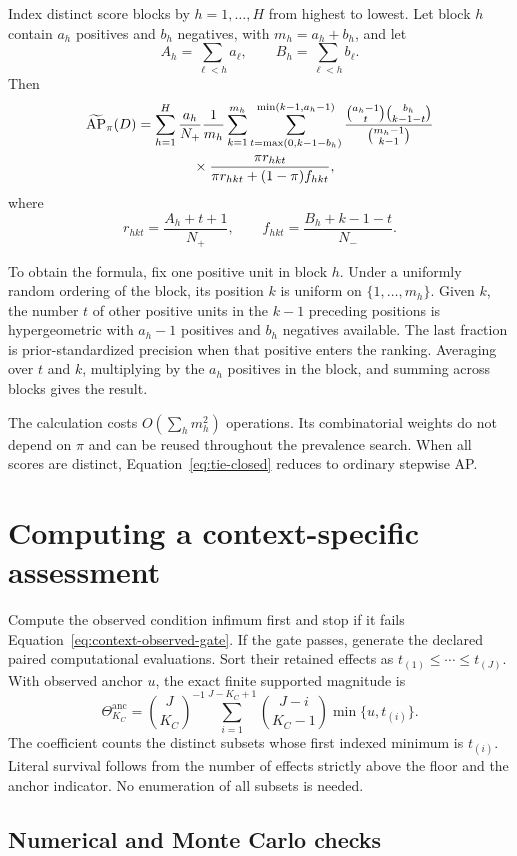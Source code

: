\documentclass[11pt]{article}
\newcommand{\AP}{\operatorname{AP}}
\newcommand{\APta}{\widetilde{\AP}}
\newcommand{\Thetaanc}{\Theta^{\mathrm{anc}}}
\theoremstyle{remark}
\begin{document}
Index distinct score blocks by $h=1,\ldots,H$ from highest to lowest. Let block
$h$ contain $a_h$ positives and $b_h$ negatives, with $m_h=a_h+b_h$, and let
\[
A_h=\sum_{\ell<h}a_\ell,
\qquad
B_h=\sum_{\ell<h}b_\ell.
\]
Then
\begin{align}
\APta_\pi(D)
&=
\sum_{h=1}^H
\frac{a_h}{N_+}\frac1{m_h}
\sum_{k=1}^{m_h}
\sum_{t=\max(0,k-1-b_h)}^{\min(k-1,a_h-1)}
\frac{\binom{a_h-1}{t}\binom{b_h}{k-1-t}}
{\binom{m_h-1}{k-1}}
\notag\\
&\qquad\qquad\times
\frac{\pi r_{hkt}}
{\pi r_{hkt}+(1-\pi)f_{hkt}},
\label{eq:tie-closed}
\end{align}
where
\[
r_{hkt}=\frac{A_h+t+1}{N_+},
\qquad
f_{hkt}=\frac{B_h+k-1-t}{N_-}.
\]

To obtain the formula, fix one positive unit in block $h$. Under a uniformly
random ordering of the block, its position $k$ is uniform on
$\{1,\ldots,m_h\}$. Given $k$, the number $t$ of other positive units in the
$k-1$ preceding positions is hypergeometric with $a_h-1$ positives and $b_h$
negatives available. The last fraction is prior-standardized precision when
that positive enters the ranking. Averaging over $t$ and $k$, multiplying by
the $a_h$ positives in the block, and summing across blocks gives the result.

The calculation costs $O(\sum_hm_h^2)$ operations. Its combinatorial weights
do not depend on $\pi$ and can be reused throughout the prevalence search. When
all scores are distinct, Equation~\eqref{eq:tie-closed} reduces to ordinary
stepwise AP.


\section{Computing a context-specific assessment}
\label{app:context-computation}

Compute the observed condition infimum first and stop if it fails
Equation~\eqref{eq:context-observed-gate}. If the gate passes, generate the
declared paired computational evaluations. Sort their retained effects as
$t_{(1)}\leq\cdots\leq t_{(J)}$. With observed anchor $u$, the exact finite
supported magnitude is
\[
\Thetaanc_{K_C}
=\binom{J}{K_C}^{-1}
\sum_{i=1}^{J-K_C+1}
\binom{J-i}{K_C-1}\min\{u,t_{(i)}\}.
\]
The coefficient counts the distinct subsets whose first indexed minimum is
$t_{(i)}$. Literal survival follows from the number of effects strictly above
the floor and the anchor indicator. No enumeration of all subsets is needed.

\subsection{Numerical and Monte Carlo checks}
\end{document}
